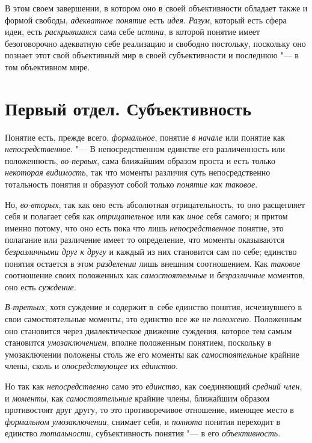 В этом своем завершении, в котором оно в своей объективности
обладает также и формой свободы, {\em адекватное понятие} есть
{\em идея}. {\em Разум}, который есть сфера идеи, есть {\em раскрывшаяся}
сама себе {\em истина}, в которой понятие имеет безоговорочно адекватную себе
реализацию и свободно постольку, поскольку оно познает этот свой
объективный мир в своей субъективности и последнюю "--- в том объективном мире.

\part[Первый отдел\\ СУБЪЕКТИВНОСТЬ]{Первый отдел. Субъективность}

Понятие есть, прежде всего, {\em формальное}, понятие {\em в начале} или
понятие как {\em непосредственное}. "---
В непосредственном единстве его различенность или
положенность, {\em во-первых}, сама ближайшим образом проста и есть только
{\em некоторая видимость}, так что моменты различия суть непосредственно
тотальность понятия и образуют собой только {\em понятие как таковое}.

Но, {\em во-вторых}, так как оно есть абсолютная отрицательность, то оно
расщепляет себя и полагает себя как {\em отрицательное} или
как {\em иное} себя самого; и притом именно потому, что оно есть пока что лишь
{\em непосредственное} понятие, это полагание или различение имеет то
определение, что моменты оказываются {\em безразличными друг к другу}
и каждый из них становится сам по себе; единство понятия
остается в этом {\em разделении} лишь внешним соотношением. Как
{\em таковое} соотношение своих положенных как {\em самостоятельные} и
{\em безразличные} моментов, оно есть {\em суждение}.

{\em В-третьих}, хотя
суждение и содержит в~себе единство понятия, исчезнувшего в свои
самостоятельные моменты, это единство все же не {\em положено}.
Положенным оно становится через диалектическое движение
суждения, которое тем самым становится {\em умозаключением},
вполне положенным понятием, поскольку в умозаключении
положены столь же его моменты как {\em самостоятельные}
крайние члены, сколь и {\em опосредствующее} их {\em единство}.

Но так как {\em непосредственно} само это {\em единство}, как соединяющий
{\em средний член}, и {\em моменты}, как {\em самостоятельные}
крайние члены, ближайшим образом противостоят друг другу, то
это противоречивое отношение, имеющее место в
{\em формальном умозаключении}, снимает себя, и {\em полнота} понятия
переходит в единство {\em тотальности},
субъективность понятия "--- в его {\em объективность}.

